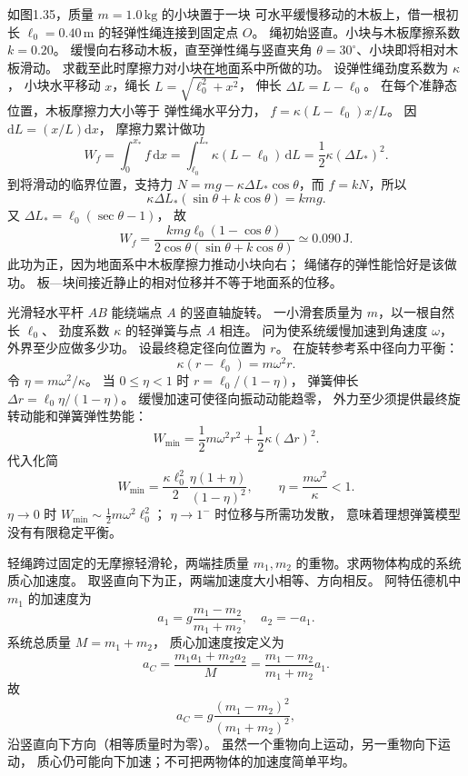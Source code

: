 如图1.35，质量 $m=1.0\,\mathrm{kg}$ 的小块置于一块
可水平缓慢移动的木板上，借一根初长
$\ell_0=0.40\,\mathrm m$ 的轻弹性绳连接到固定点 $O$。
绳初始竖直。小块与木板摩擦系数 $k=0.20$。
缓慢向右移动木板，直至弹性绳与竖直夹角
$\theta=30^\circ$、小块即将相对木板滑动。
求截至此时摩擦力对小块在地面系中所做的功。
\exsolution
设弹性绳劲度系数为 $\kappa$，
小块水平移动 $x$，绳长
$L=\sqrt{\ell_0^2+x^2}$，
伸长 $\Delta L=L-\ell_0$。
在每个准静态位置，木板摩擦力大小等于
弹性绳水平分力，
$f=\kappa(L-\ell_0)x/L$。
因 $\mathrm dL=(x/L)\mathrm dx$，
摩擦力累计做功
\[
W_f=\int_0^{x_*}f\,\mathrm dx
=\int_{\ell_0}^{L_*}\kappa(L-\ell_0)\,\mathrm dL
=\frac12\kappa(\Delta L_*)^2.
\]
到将滑动的临界位置，支持力
$N=mg-\kappa\Delta L_*\cos\theta$，而
$f=kN$，所以
\[
\kappa\Delta L_*(\sin\theta+k\cos\theta)=kmg.
\]
又 $\Delta L_*=\ell_0(\sec\theta-1)$，
故
\[
\boxed{W_f=
\frac{kmg\ell_0(1-\cos\theta)}
 {2\cos\theta(\sin\theta+k\cos\theta)}
\simeq0.090\,\mathrm J}.
\]
\excheck 此功为正，因为地面系中木板摩擦力推动小块向右；
绳储存的弹性能恰好是该做功。
板—块间接近静止的相对位移并不等于地面系的位移。

光滑轻水平杆 $AB$ 能绕端点 $A$ 的竖直轴旋转。
一小滑套质量为 $m$，以一根自然长 $\ell_0$、
劲度系数 $\kappa$ 的轻弹簧与点 $A$ 相连。
问为使系统缓慢加速到角速度 $\omega$，
外界至少应做多少功。
\exsolution
设最终稳定径向位置为 $r$。
在旋转参考系中径向力平衡：
\[
\kappa(r-\ell_0)=m\omega^2 r.
\]
令 $\eta=m\omega^2/\kappa$。
当 $0\le\eta<1$ 时
$r=\ell_0/(1-\eta)$，
弹簧伸长
$\Delta r=\ell_0\eta/(1-\eta)$。
缓慢加速可使径向振动动能趋零，
外力至少须提供最终旋转动能和弹簧弹性势能：
\[
W_{\min}
=\frac12m\omega^2r^2
+\frac12\kappa(\Delta r)^2.
\]
代入化简
\[
\boxed{W_{\min}=
\frac{\kappa\ell_0^2}{2}
\frac{\eta(1+\eta)}{(1-\eta)^2}},
\qquad
\eta=\frac{m\omega^2}{\kappa}<1.
\]
\excheck $\eta\to0$ 时
$W_{\min}\sim \tfrac12m\omega^2\ell_0^2$；
$\eta\to1^-$ 时位移与所需功发散，
意味着理想弹簧模型没有有限稳定平衡。

轻绳跨过固定的无摩擦轻滑轮，两端挂质量
$m_1,m_2$ 的重物。求两物体构成的系统质心加速度。
\exsolution
取竖直向下为正，两端加速度大小相等、方向相反。
阿特伍德机中 $m_1$ 的加速度为
\[
a_1=g\frac{m_1-m_2}{m_1+m_2},
\quad a_2=-a_1.
\]
系统总质量 $M=m_1+m_2$，
质心加速度按定义为
\[
a_C=\frac{m_1a_1+m_2a_2}{M}
=\frac{m_1-m_2}{m_1+m_2}a_1.
\]
故
\[
\boxed{a_C=g\frac{(m_1-m_2)^2}{(m_1+m_2)^2}},
\]
沿竖直向下方向（相等质量时为零）。
\excheck 虽然一个重物向上运动，另一重物向下运动，
质心仍可能向下加速；不可把两物体的加速度简单平均。

